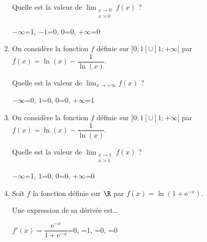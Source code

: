 \documentclass[french]{article}
\begin{document}
\begin{spacing}{1.2}
\begin{enumerate}
Quelle est la valeur de \(\displaystyle\lim_{\substack{x\to 0\\x>0}}f(x)\) ?

\begin{Form}
\ChoiceMenu[radio,name=Q2,default=-0,align=0,radiosymbol=\ding{108},height=0.5em,bordercolor=black]{}
{\(-\infty\)=1,
\newline \(-1\)=0,
\newline \(0\)=0,
\newline \(+\infty\)=0}
\end{Form}

\item On considère la fonction \(f\) définie sur \(]0;1[\cup]1;+\infty[\) par \(f(x)=\ln(x)-\dfrac{1}{\ln(x)}\).

Quelle est la valeur de \(\displaystyle\lim_{x\to +\infty}f(x)\) ?

\begin{Form}
\ChoiceMenu[radio,name=Q3,default=-0,align=0,radiosymbol=\ding{108},height=0.5em,bordercolor=black]{}
{\(-\infty\)=0,
\newline \(1\)=0,
\newline \(0\)=0,
\newline \(+\infty\)=1}
\end{Form}

\item On considère la fonction \(f\) définie sur \(]0;1[\cup]1;+\infty[\) par \(f(x)=\ln(x)-\dfrac{1}{\ln(x)}\).

Quelle est la valeur de \(\displaystyle\lim_{\substack{x\to 1\\x>1}}f(x)\) ?

\begin{Form}
\ChoiceMenu[radio,name=Q4,default=-0,align=0,radiosymbol=\ding{108},height=0.5em,bordercolor=black]{}
{\(-\infty\)=1,
\newline \(1\)=0,
\newline \(0\)=0,
\newline \(+\infty\)=0}
\end{Form}

\item Soit $f$ la fonction définie sur $\R$ par $f(x)=\ln\left(1+\text{e}^{-x}\right)$.

Une expression de sa dérivée est\dots

\begin{Form}
\ChoiceMenu[radio,name=Q5,default=-0,align=0,radiosymbol=\ding{108},height=0.2cm,bordercolor=black]{}
{{$f'(x)=\dfrac{\text{e}^{-x}}{1+\text{e}^{-x}}$}=0,
=1,
=0,
=0}
\end{Form}


\end{enumerate}
\end{spacing}
\end{document}
